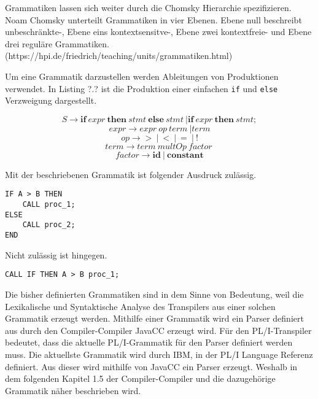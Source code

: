 Grammatiken lassen sich weiter durch die Chomsky Hierarchie spezifizieren. Noam Chomsky unterteilt Grammatiken in vier Ebenen. Ebene null beschreibt unbeschränkte-, Ebene eins kontextsensitve-, Ebene zwei kontextfreie- und Ebene drei reguläre Grammatiken.(https://hpi.de/friedrich/teaching/units/grammatiken.html) 

\pagebreak

Um eine Grammatik darzustellen werden Ableitungen von Produktionen verwendet. In Listing ?.? ist die Produktion einer einfachen \verb+if+ und \verb+else+ Verzweigung dargestellt.

\begin{center}
\begin{equation}
S \to \mathbf{if}\: expr\: \mathbf{then}\: stmt\: \mathbf{else}\: stmt\: | \mathbf{if}\: expr\: \mathbf{then}\: stmt;
\end{equation}
\begin{equation}
expr \to expr\: op\: term\: | term
\end{equation}
\begin{equation}
op \to \mathbf{>}\: |\: \mathbf{<}\: |\: \mathbf{=}\: |\: \mathbf{!}
\end{equation}
\begin{equation}
term \to term\: multOp\: factor\:
\end{equation}
\begin{equation}
factor \to \mathbf{id}\: |\: \mathbf{constant} 
\end{equation}
\end{center}
 
Mit der beschriebenen Grammatik ist folgender Ausdruck zulässig.

\begin{verbatim}
IF A > B THEN 
	CALL proc_1;
ELSE 
	CALL proc_2;
END
\end{verbatim}

Nicht zulässig ist hingegen.

\begin{verbatim} 
CALL IF THEN A > B proc_1;
\end{verbatim}

	
Die bisher definierten Grammatiken sind in dem Sinne von Bedeutung, weil die Lexikalische und Syntaktische Analyse des Transpilers aus einer solchen Grammatik erzeugt werden. Mithilfe einer Grammatik wird ein Parser definiert aus durch den Compiler-Compiler JavaCC erzeugt wird. 
Für den PL/I-Transpiler bedeutet, dass die aktuelle PL/I-Grammatik für den Parser definiert werden muss. Die aktuellste Grammatik wird durch IBM, in der PL/I Language Referenz definiert. Aus dieser wird mithilfe von JavaCC ein Parser erzeugt. Weshalb in dem folgenden Kapitel 1.5 der Compiler-Compiler und die dazugehörige Grammatik näher beschrieben wird.

